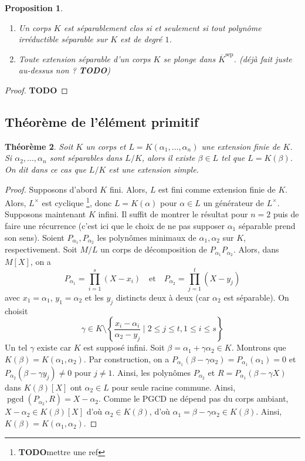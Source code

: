 \documentclass{article}
\newcommand{\sep}{\mathrm{sep}}
\DeclareMathOperator{\pgcd}{pgcd}
\newcommand{\todo}{\textbf{TODO}}
\theoremstyle{plain}
\newtheorem{theorem}{Théorème}[subsection]
\newtheorem{proposition}[theorem]{Proposition}
\theoremstyle{definition}
\theoremstyle{remark}
\begin{document}
\begin{proposition} \leavevmode
    \begin{enumerate}
        \item Un corps $K$ est séparablement clos si et seulement si tout polynôme irréductible séparable sur $K$ est de degré $1$.
        \item Toute extension séparable d'un corps $K$ se plonge dans $\overline{K}^\sep$. (déjà fait juste au-dessus non ? \todo)
    \end{enumerate}
\end{proposition}

\begin{proof}
    \todo
\end{proof}

\subsection{Théorème de l'élément primitif}

\begin{theorem}
    Soit $K$ un corps et $L = K(\alpha_1,\dots,\alpha_n)$ une extension finie de $K$. Si $\alpha_2,\dots,\alpha_n$ sont séparables dans $L/K$, alors il existe $\beta \in L$ tel que $L = K(\beta)$. On dit dans ce cas que $L/K$ est une \emph{extension simple}.
\end{theorem}

\begin{proof}
    Supposons d'abord $K$ fini. Alors, $L$ est fini comme extension finie de $K$. Alors, $L^\times$ est cyclique \footnote{\todo mettre une ref}, donc $L = K(\alpha)$ pour $\alpha \in L$ un générateur de $L^\times$. \\
    Supposons maintenant $K$ infini. Il suffit de montrer le résultat pour $n=2$ puis de faire une récurrence (c'est ici que le choix de ne pas supposer $\alpha_1$ séparable prend son sens). Soient $P_{\alpha_1}, P_{\alpha_2}$ les polynômes minimaux de $\alpha_1,\alpha_2$ sur $K$, respectivement. Soit $M/L$ un corps de décomposition de $P_{\alpha_1}P_{\alpha_2}$. Alors, dans $M[X]$, on a
    \[P_{\alpha_1} = \prod_{i=1}^s (X-x_i) \quad \text{et} \quad P_{\alpha_2} = \prod_{j=1}^t (X-y_j) \]
    avec $x_1 = \alpha_1$, $y_1 = \alpha_2$ et les $y_j$ distincts deux à deux (car $\alpha_2$ est séparable). On choisit
    \[\gamma \in K \setminus \left\{\frac{x_i-\alpha_i}{\alpha_2-y_j} \; \Big| \; 2 \le j \le t, 1 \le i \le s \right\}\]
    Un tel $\gamma$ existe car $K$ est supposé infini. Soit $\beta = \alpha_1 + \gamma \alpha_2 \in K$. Montrons que $K(\beta) = K(\alpha_1,\alpha_2)$. Par construction, on a $P_{\alpha_1} (\beta - \gamma \alpha_2) = P_{\alpha_1} (\alpha_1) = 0$ et $P_{\alpha_2} (\beta - \gamma y_j) \ne 0$ pour $j \ne 1$. Ainsi, les polynômes $P_{\alpha_2}$ et $R = P_{\alpha_1} (\beta - \gamma X)$ dans $K(\beta)[X]$ ont $\alpha_2 \in L$ pour seule racine commune. Ainsi, $\pgcd(P_{\alpha_2},R) = X-\alpha_2$. Comme le PGCD ne dépend pas du corps ambiant, $X-\alpha_2 \in K(\beta)[X]$ d'où $\alpha_2 \in K(\beta)$, d'où $\alpha_1 = \beta - \gamma\alpha_2 \in K(\beta)$. Ainsi, $K(\beta) = K(\alpha_1,\alpha_2)$.
\end{proof}
\end{document}
